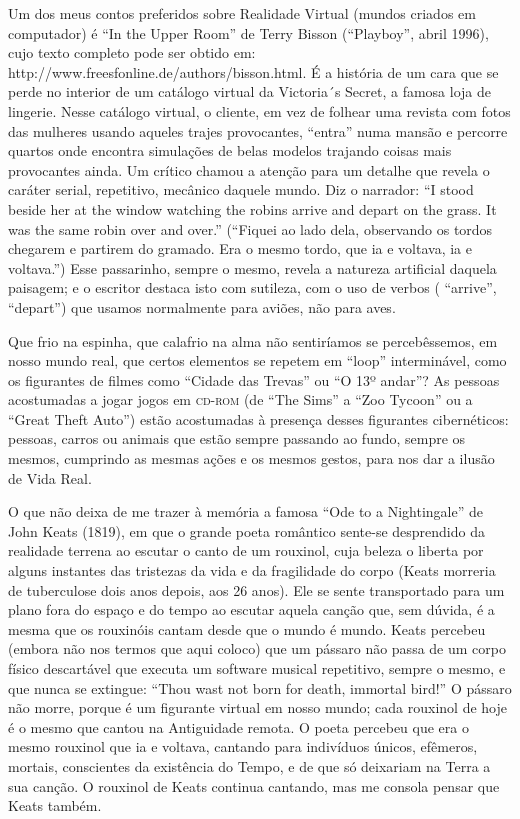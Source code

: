 Um dos meus contos preferidos sobre Realidade Virtual (mundos criados
em computador) é “In the Upper Room” de Terry Bisson (“Playboy”,
abril 1996), cujo texto completo pode ser obtido em:
http://www.freesfonline.de/authors/bisson.html. É a história de um
cara que se perde no interior de um catálogo virtual da Victoria´s
Secret, a famosa loja de lingerie. Nesse catálogo virtual, o cliente,
em vez de folhear uma revista com fotos das mulheres usando aqueles
trajes provocantes, “entra” numa mansão e percorre quartos onde
encontra simulações de belas modelos trajando coisas mais provocantes
ainda. Um crítico chamou a atenção para um detalhe que revela o
caráter serial, repetitivo, mecânico daquele mundo. Diz o narrador:
“I stood beside her at the window watching the robins arrive and
depart on the grass. It was the same robin over and over.” (“Fiquei
ao lado dela, observando os tordos chegarem e partirem do gramado.
Era o mesmo tordo, que ia e voltava, ia e voltava.”) Esse passarinho,
sempre o mesmo, revela a natureza artificial daquela paisagem; e o
escritor destaca isto com sutileza, com o uso de verbos ( “arrive”,
“depart”) que usamos normalmente para aviões, não para aves.

Que frio na espinha, que calafrio na alma não sentiríamos se
percebêssemos, em nosso mundo real, que certos elementos se repetem
em “loop” interminável, como os figurantes de filmes como “Cidade das
Trevas” ou “O 13º andar”? As pessoas acostumadas a jogar jogos em
\textsc{cd-rom} (de “The Sims” a “Zoo Tycoon” ou a “Great Theft Auto”) estão
acostumadas à presença desses figurantes cibernéticos: pessoas,
carros ou animais que estão sempre passando ao fundo, sempre os
mesmos, cumprindo as mesmas ações e os mesmos gestos, para nos dar a
ilusão de Vida Real.

O que não deixa de me trazer à memória a famosa “Ode to a Nightingale”
de John Keats (1819), em que o grande poeta romântico sente-se
desprendido da realidade terrena ao escutar o canto de um rouxinol,
cuja beleza o liberta por alguns instantes das tristezas da vida e da
fragilidade do corpo (Keats morreria de tuberculose dois anos depois,
aos 26 anos). Ele se sente transportado para um plano fora do espaço
e do tempo ao escutar aquela canção que, sem dúvida, é a mesma que os
rouxinóis cantam desde que o mundo é mundo. Keats percebeu (embora
não nos termos que aqui coloco) que um pássaro não passa de um corpo
físico descartável que executa um software musical repetitivo, sempre
o mesmo, e que nunca se extingue: “Thou wast not born for death,
immortal bird!” O pássaro não morre, porque é um figurante virtual em
nosso mundo; cada rouxinol de hoje é o mesmo que cantou na
Antiguidade remota. O poeta percebeu que era o mesmo rouxinol que ia
e voltava, cantando para indivíduos únicos, efêmeros, mortais,
conscientes da existência do Tempo, e de que só deixariam na Terra a
sua canção. O rouxinol de Keats continua cantando, mas me consola
pensar que Keats também.

